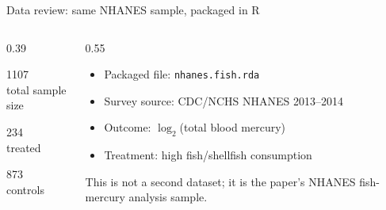 \documentclass[aspectratio=169,10pt]{ctexbeamer}
\begin{document}
\begin{frame}{Data review: same NHANES sample, packaged in R}
  \begin{columns}[T,totalwidth=\textwidth]
    \begin{column}{0.39\textwidth}
      \begin{bluebox}
        \centering
        {\Huge 1107}\\
        total sample size
      \end{bluebox}
      \vspace{0.25cm}
      \begin{bluebox}
        \centering
        {\Huge 234}\\
        treated
      \end{bluebox}
      \vspace{0.25cm}
      \begin{bluebox}
        \centering
        {\Huge 873}\\
        controls
      \end{bluebox}
    \end{column}
    \begin{column}{0.55\textwidth}
      \begin{graybox}[title=Data source]
        \begin{itemize}
          \item Packaged file: \texttt{nhanes.fish.rda}
          \item Survey source: CDC/NCHS NHANES 2013--2014
          \item Outcome: $\log_2$(total blood mercury)
          \item Treatment: high fish/shellfish consumption
        \end{itemize}
      \end{graybox}
      \vspace{0.35cm}
      \begin{yellowbox}
        \centering
        This is not a second dataset; it is the paper's NHANES fish-mercury analysis sample.
      \end{yellowbox}
    \end{column}
  \end{columns}
\end{frame}
\end{document}
